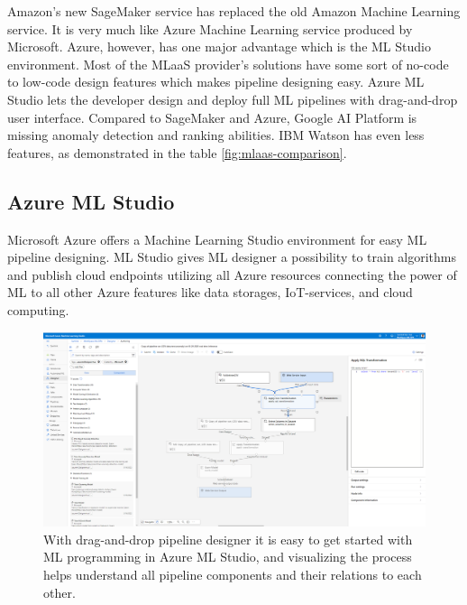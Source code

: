 Amazon's new SageMaker service
has replaced the old Amazon Machine Learning service.
It is very much like Azure Machine Learning service
produced by Microsoft.
Azure, however,
has one major advantage
which is the ML Studio environment.
Most of the MLaaS provider's solutions
have some sort of no-code to low-code design features
which makes pipeline designing easy.
Azure ML Studio lets the developer design and deploy
full ML pipelines with drag-and-drop user interface.
Compared to SageMaker and Azure,
Google AI Platform is missing anomaly detection and ranking abilities.
IBM Watson has even less features,
as demonstrated in the table \ref{fig:mlaas-comparison}.~\cite{altexsoft2021mlaas}


\subsection{Azure ML Studio}\label{subsec:bg-azure-ml-studio-algorithms}

Microsoft Azure offers a Machine Learning Studio environment
for easy ML pipeline designing.
ML Studio gives ML designer a possibility to
train algorithms and publish cloud endpoints
utilizing all Azure resources
connecting the power of ML
to all other Azure features
like data storages, IoT-services, and cloud computing.~\cite{altexsoft2021mlaas,microsoft2022azureml}

\begin{figure}[htb]
    \centering
    \includegraphics[width=150mm]{./appendices/azure-ml-studio-example}
    \caption{With drag-and-drop pipeline designer
    it is easy to get started with ML programming in Azure ML Studio,
        and visualizing the process helps understand all pipeline components
        and their relations to each other.
    \label{fig:azure-ml-studio-example}}
\end{figure}

